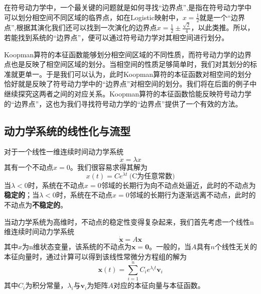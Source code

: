 在符号动力学中，一个最关键的问题就是如何寻找“边界点”,是指在符号动力学中可以划分相空间不同区域的临界点，如在Logistic映射中，$x=\frac{1}{2}$就是一个“边界点”,根据其演化我们还可以找到一次演化的边界点$x=\frac{1}{2}\pm\frac{\sqrt{2}}{4}$，以此类推。所以，若能找到系统的“边界点”，便可以通过符号动力学对其相空间进行划分。

Koopman算符的本征函数能够划分相空间区域的不同性质，而符号动力学的边界点也是反映了相空间区域的划分。当相空间的性质足够简单时，我们对其划分的标准就更单一。于是我们可以认为，此时Koopman算符的本征函数对相空间的划分恰好就是反映了符号动力学中的“边界点”对相空间的划分。我们将在后面的例子中继续探究这两者之间的对应关系。Koopman算符的本征函数恰能反映符号动力学的“边界点”，这也为我们寻找符号动力学的“边界点”提供了一个有效的方法。

\subsection{动力学系统的线性化与流型}

对于一个线性一维连续时间动力学系统
\begin{equation}
    \dot{x}=\lambda x
\end{equation}
其有一个不动点$x=0$。我们很容易求得其解为
\begin{equation}
    x(t)=Ce^{\lambda t}\   \text{(C为任意常数)}
\end{equation}
当$\lambda<0$时，系统在不动点$x=0$邻域的长期行为向不动点处逼近，此时的不动点为\textbf{稳定的}；当$\lambda<0$时，系统在不动点$x=0$邻域的长期行为逐渐远离不动点，此时的不动点为\textbf{不稳定的}。

当动力学系统为高维时，不动点的稳定性变得复杂起来，我们首先考虑一个线性n维连续时间动力学系统
\begin{equation}
    \dot{\mathbf{x}}=A\mathbf{x}
\end{equation}
其中$x$为n维状态变量，该系统的不动点为$\mathbf{x}=\mathbf{0}$。一般的，当$A$具有$n$个线性无关的本征向量时，通过计算可以得到该线性常微分方程组的解为
\begin{equation}
    \mathbf{x}(t)=\sum_{i=1}^n C_ie^{\lambda_it}\mathbf{v}_i
\end{equation}
其中$C_i$为积分常量，$\lambda_i$与$\mathbf{v}_i$为矩阵$A$对应的本征向量与本征函数。

